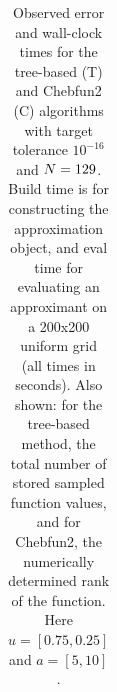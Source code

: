 \begin{table}[p]
\begin{tabular}{c|c|c|c|c|c}
  \end{tabular}
  \caption{Observed error and wall-clock times for the tree-based (T) and Chebfun2 (C) algorithms with target tolerance $10^{-16}$ and $N=129$. Build time is for constructing the approximation object, and eval time for evaluating an approximant on a 200x200 uniform grid (all times in seconds). Also shown: for the tree-based method, the total number of stored sampled function values, and for Chebfun2, the numerically determined rank of the function. Here $u=[0.75,0.25]$ and $a=[5,10]$.}
  \label{tab:timing2D}

\end{table}
